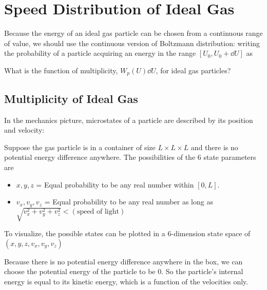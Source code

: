 \documentclass[class=article, crop=false, 12pt]{standalone}
\begin{document}
\linesep
\section{Speed Distribution of Ideal Gas}

Because the energy of an ideal gas particle can be chosen from a continuous range of value,
we should use the continuous version of Boltzmann distribution:
writing the probability of a particle acquiring an energy in the range $[U_0,U_0+\dd{U}]$ as

What is the function of multiplicity, $W_p(U)\dd{U}$, for ideal gas particles?



\subsection{Multiplicity of Ideal Gas}

In the mechanics picture,
microstates of a particle are described by its position and velocity:

Suppose the gas particle is in a container of size $L\times L \times L$ and 
there is no potential energy difference anywhere.
The possibilities of the 6 state parameters are
\begin{itemize}
    \item $x,y,z$ = Equal probability to be any real number within $[0,L]$.
    
    \item $v_x,v_y,v_z$ = Equal probability to be any real number as long as $\sqrt{v_x^2+v_y^2+v_z^2}<(\text{speed of light})$
    
\end{itemize} 

To visualize, the possible states can be plotted in a 6-dimension state space of $(x,y,z, v_x, v_y, v_z)$ 



Because there is no potential energy difference anywhere in the box,
we can choose the potential energy of the particle to be $0$.
So the particle's internal energy is equal to its kinetic energy, which is a function of the velocities only.
\end{document}
